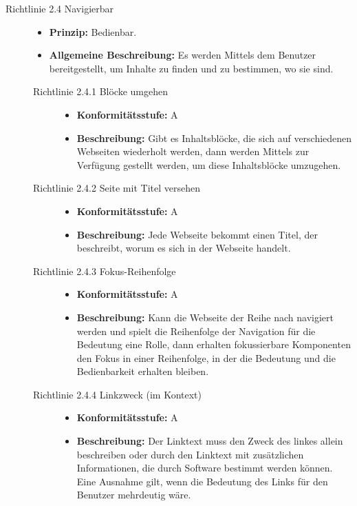 \begin{description}
	\item[Richtlinie 2.4 Navigierbar]\hfill
	\begin{itemize}
		\item \textbf{Prinzip:} Bedienbar.
		\item \textbf{Allgemeine Beschreibung:} Es werden Mittels dem Benutzer bereitgestellt, um Inhalte zu finden und zu bestimmen, wo sie sind.
	\end{itemize}
	
	\begin{description}
		\item[Richtlinie 2.4.1 Blöcke umgehen]\hfill
		\begin{itemize}
			\item \textbf{Konformitätsstufe:} A
			\item \textbf{Beschreibung:} Gibt es Inhaltsblöcke, die sich auf verschiedenen Webseiten wiederholt werden, dann werden Mittels zur Verfügung 
			gestellt werden, um diese Inhaltsblöcke umzugehen.		
		\end{itemize}
		
		\item[Richtlinie 2.4.2 Seite mit Titel versehen]\hfill
		\begin{itemize}
			\item \textbf{Konformitätsstufe:} A
			\item \textbf{Beschreibung:} Jede Webseite bekommt einen Titel, der beschreibt, worum es sich in der Webseite handelt.
		\end{itemize}
		
		\item[Richtlinie 2.4.3 Fokus-Reihenfolge]\hfill
		\begin{itemize}
			\item \textbf{Konformitätsstufe:} A
			\item \textbf{Beschreibung:} Kann die Webseite der Reihe nach navigiert werden und spielt die Reihenfolge der Navigation für die Bedeutung eine 
			Rolle, dann erhalten fokussierbare Komponenten den Fokus in einer Reihenfolge, in der die Bedeutung und die Bedienbarkeit erhalten bleiben.
		\end{itemize}
		
		\item[Richtlinie 2.4.4 Linkzweck (im Kontext)]\hfill
		\begin{itemize}
			\item \textbf{Konformitätsstufe:} A
			\item \textbf{Beschreibung:} Der Linktext muss den Zweck des linkes allein beschreiben oder durch den Linktext mit zusätzlichen 
			Informationen, die durch Software bestimmt werden können. Eine Ausnahme gilt, wenn die Bedeutung des Links für den Benutzer mehrdeutig wäre.
		\end{itemize}
		

\end{description}
\end{description}
